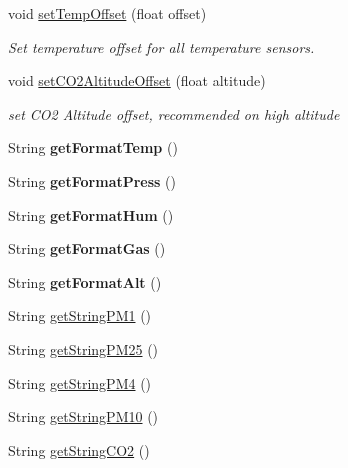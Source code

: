 \begin{DoxyCompactItemize}
void \hyperlink{classSensors_a122c0d2922d2a80984e8a3ac21b883c3}{set\+Temp\+Offset} (float offset)
\begin{DoxyCompactList}\small\item\em Set temperature offset for all temperature sensors. \end{DoxyCompactList}\item 
\mbox{\label{classSensors_a27eec756609a421b3927c0dc132ae7c6}} 
void \hyperlink{classSensors_a27eec756609a421b3927c0dc132ae7c6}{set\+C\+O2\+Altitude\+Offset} (float altitude)
\begin{DoxyCompactList}\small\item\em set C\+O2 Altitude offset, recommended on high altitude \end{DoxyCompactList}\item 
\mbox{\label{classSensors_a38f2ebcfa7900fe80972f43fbc70a84b}} 
String {\bfseries get\+Format\+Temp} ()
\item 
\mbox{\label{classSensors_ab163bc178118ee3ab5656792a6757254}} 
String {\bfseries get\+Format\+Press} ()
\item 
\mbox{\label{classSensors_a92a6d7a37877d373d9653d2327189238}} 
String {\bfseries get\+Format\+Hum} ()
\item 
\mbox{\label{classSensors_af4a5c493e024e724e0009bb95f588be8}} 
String {\bfseries get\+Format\+Gas} ()
\item 
\mbox{\label{classSensors_ab56838d386d6d71043d3ad0b97244d73}} 
String {\bfseries get\+Format\+Alt} ()
\item 
String \hyperlink{classSensors_a427616fc30b3d9e63ce6be5032b614c2}{get\+String\+P\+M1} ()
\item 
String \hyperlink{classSensors_ab07001101683393a4cc3609ac6449b3c}{get\+String\+P\+M25} ()
\item 
String \hyperlink{classSensors_ab4eb2c9e8cd83823dfedb2c72aa2b405}{get\+String\+P\+M4} ()
\item 
String \hyperlink{classSensors_ab5eb58786c893bd552ef14516489c50d}{get\+String\+P\+M10} ()
\item 
String \hyperlink{classSensors_a64c1c667d899309fdbc08e88b8e9f2fc}{get\+String\+C\+O2} ()
\item 

\end{DoxyCompactItemize}
